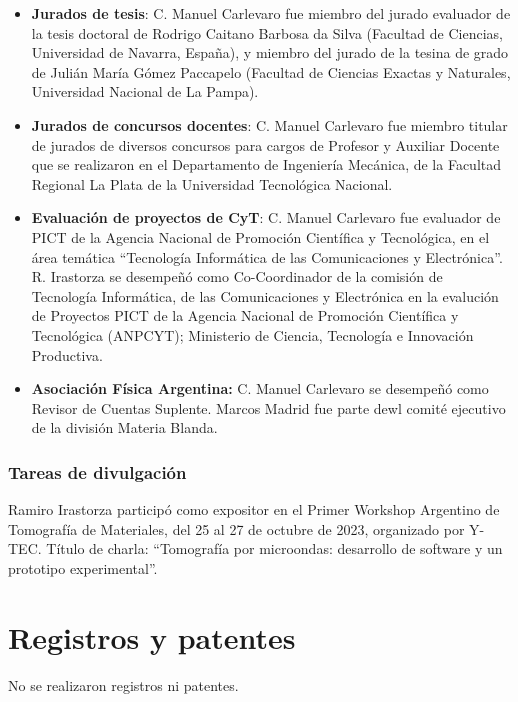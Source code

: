 \documentclass[a4paper,11pt,twoside,final,titlepage,onecolumn,openright]{report}
\begin{document}
\begin{itemize}
\item \textbf{Jurados de tesis}: C. Manuel Carlevaro fue miembro del jurado evaluador de la tesis doctoral de Rodrigo Caitano Barbosa da Silva (Facultad de Ciencias, Universidad de Navarra, España), y miembro del jurado de la tesina de grado de Julián María Gómez Paccapelo (Facultad de Ciencias Exactas y Naturales, Universidad Nacional de La Pampa).

\item \textbf{Jurados de concursos docentes}: C. Manuel Carlevaro fue miembro titular de jurados de diversos concursos para cargos de Profesor y Auxiliar Docente que se realizaron en el Departamento de Ingeniería Mecánica, de la Facultad Regional La Plata de la Universidad Tecnológica Nacional.

\item \textbf{Evaluación de proyectos de CyT}: C. Manuel Carlevaro fue evaluador de PICT de la Agencia Nacional de Promoción Científica y Tecnológica, en el área temática ``Tecnología Informática de las Comunicaciones y Electrónica''. R. Irastorza se desempeñó como Co-Coordinador de la comisión de Tecnología Informática, de las Comunicaciones y Electrónica en la evalución de Proyectos PICT de la Agencia Nacional de Promoción Científica y Tecnológica (ANPCYT); Ministerio de Ciencia, Tecnología e Innovación Productiva. 
 
\item \textbf{Asociación Física Argentina:} C. Manuel Carlevaro se desempeñó como Revisor de Cuentas Suplente. Marcos Madrid fue parte dewl comité ejecutivo de la división Materia Blanda.
 
\end{itemize}




\subsubsection{Tareas de divulgación}

Ramiro Irastorza participó como expositor en el Primer Workshop Argentino de Tomografía de Materiales, del 25 al 27 de octubre de 2023, organizado por Y-TEC. Título de charla: ``Tomografía por microondas: desarrollo de software y un prototipo experimental''.

\section{Registros y patentes}

No se realizaron registros ni patentes.
\end{document}
